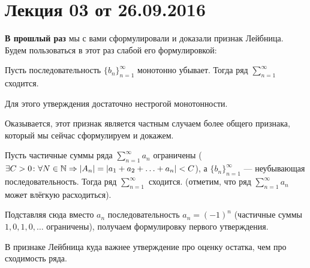 \documentclass[a4paper, 12pt]{article}
\begin{document}
\pagestyle{fancy}
\section{Лекция 03 от 26.09.2016}
\textbf{В прошлый раз} мы с вами сформулировали и доказали признак Лейбница. Будем пользоваться в этот раз слабой его формулировкой:
\begin{Statement}
	Пусть последовательность $\{b_n\}_{n = 1}^{\infty}$ монотонно убывает. Тогда ряд $\sum\limits_{n = 1}^{\infty}$ сходится. 
\end{Statement}
\begin{Comment}
	Для этого утверждения достаточно нестрогой монотонности.
\end{Comment}
Оказывается, этот признак является частным случаем более общего признака, который мы сейчас сформулируем и докажем.
\begin{Statement}
	Пусть частичные суммы ряда $\sum\limits_{n=1}^{\infty}a_n$ ограничены ($\exists C>0\colon \forall N\in \mathbb{N} \Rightarrow |A_n| = |a_1 + a_2 + \ldots + a_n| < C$), а $\{b_n\}_{n=1}^{\infty}$ --- неубывающая  последовательность. Тогда ряд $\sum\limits_{n=1}^{\infty}$ сходится. (отметим, что ряд $\sum\limits_{n=1}^{\infty}a_n$ может влёгкую расходиться). 
\end{Statement}
Подставляя сюда вместо $a_n$ последовательность $a_n = (-1)^n$ (частичные суммы $1, 0, 1, 0, \ldots$ ограничены), получаем формулировку первого утверждения.
\begin{Comment}
	В признаке Лейбница куда важнее утверждение про оценку остатка, чем про сходимость ряда.
\end{Comment}
\end{document}
